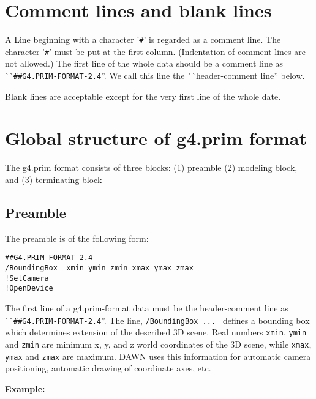 \section{Comment lines and blank lines}   

A Line beginning with a character '\verb+#+' is regarded as a comment line.  
The character '\verb+#+' must be put at the first column.
(Indentation of comment lines are not allowed.)
The first line of the whole data should be a comment line as  
^^ ^^ \verb+##G4.PRIM-FORMAT-2.4+''. 
We call this line the ^^ ^^ header-comment line'' below.  

Blank lines are acceptable except for the very first line of the whole date. 

\section{Global structure of g4.prim format}   

The g4.prim format consists of three blocks:  
(1) preamble (2) modeling block, and  
(3) terminating block

\subsection{Preamble}   

The preamble is of the following form:  

\begin{verbatim}
##G4.PRIM-FORMAT-2.4
/BoundingBox  xmin ymin zmin xmax ymax zmax   
!SetCamera  
!OpenDevice
\end{verbatim}

\noindent
The first line of a g4.prim-format data must be the header-comment line 
as ^^ ^^ \verb+##G4.PRIM-FORMAT-2.4+''.
The line, \verb+/BoundingBox ... +  
defines a bounding box which determines extension of the described 3D scene.  
Real numbers \verb+xmin+, \verb+ymin+ and \verb+zmin+ are minimum  
x, y, and z world coordinates of the 3D scene,  
while \verb+xmax+, \verb+ymax+ and \verb+zmax+ are maximum.  
DAWN uses this information for automatic camera positioning,  
automatic drawing of coordinate axes, etc.  
\vspace{.20in}

\noindent  
{\bf{}Example:}  


